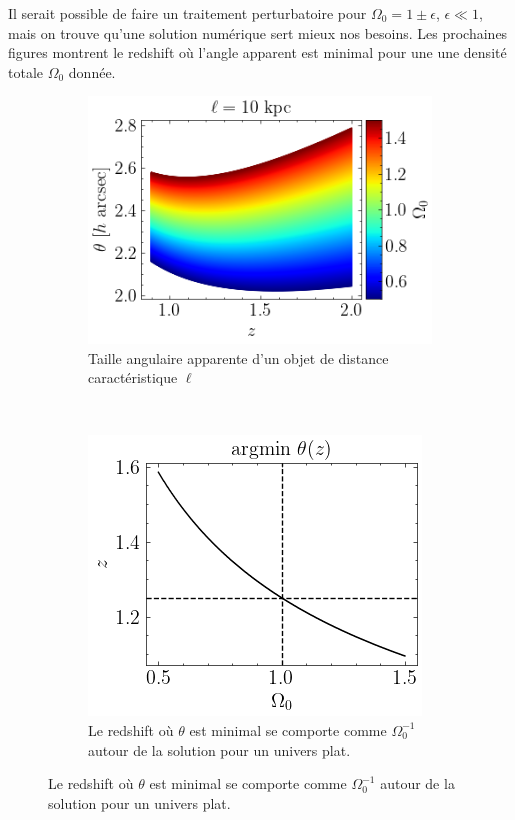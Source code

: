 \documentclass{article}
\numberwithin{equation}{section}
\begin{document}
Il serait possible de faire un traitement perturbatoire pour $\Omega_0 = 1 \pm \epsilon$, 
$\epsilon \ll 1$, mais on trouve qu'une solution numérique sert mieux nos besoins. 
Les prochaines figures montrent le redshift où l'angle apparent est minimal pour une 
une densité totale $\Omega_0$ donnée.

\begin{figure}[H]
        \centering
        \begin{subfigure}[t]{0.52\textwidth}
                \includegraphics[width=\textwidth]{theta_z}
                \caption{Taille angulaire apparente d'un objet de distance 
                caractéristique $\ell$}
                \label{fig:theta_z}
        \end{subfigure}
        ~
        \begin{subfigure}[t]{0.45\textwidth}
                \includegraphics[width=\textwidth]{zmin} 
                \caption{Le redshift où $\theta$ est minimal
                        se comporte comme $\Omega_0^{-1}$ autour 
                        de la solution pour un univers plat.}
                \label{}
        \end{subfigure}
\end{figure}
\end{document}
